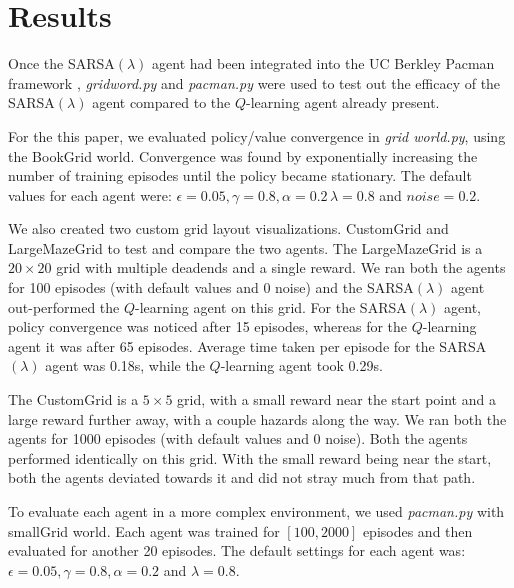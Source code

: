 \documentclass[10pt,conference]{IEEEtran}
\begin{document}
\section{Results}
\label{sec:results}
	
	Once the SARSA\((\lambda)\) agent had been integrated into
	the UC Berkley Pacman framework \cite{ucbai}, \textit{gridword.py} and 
	\textit{pacman.py} were used to test out the efficacy of the SARSA\((\lambda)\)
	agent compared to the \(Q\)-learning agent already present.  
	
	For the this paper, we evaluated policy/value convergence in \textit{grid world.py}, using
	the BookGrid world.  Convergence was found by exponentially increasing the
	number of training episodes until the policy became stationary.  The default
	values for each agent were: \(\epsilon = 0.05, \gamma = 0.8, \alpha = 0.2\,
	\lambda = 0.8\) and \(noise = 0.2\).

	We also created two custom grid layout visualizations. CustomGrid and LargeMazeGrid to test 
	and compare the two agents. The LargeMazeGrid is a \(20 \times 20\) grid with multiple deadends 
	and a single reward. We ran both the agents for 100 episodes (with default 
	values and 0 noise) and the SARSA\((\lambda)\) agent out-performed the 
	\(Q\)-learning agent on this grid. For the SARSA\((\lambda)\) agent, policy 
	convergence was noticed after 15 episodes, whereas for the \(Q\)-learning agent 
	it was after 65 episodes. Average time taken per episode for the 
	SARSA\((\lambda)\) agent was 0.18s, while the \(Q\)-learning agent took 0.29s.

	The CustomGrid is a \(5 \times 5\) grid, with a small reward near the start point and a 
	large reward further away, with a couple hazards along the way. We ran both the 
	agents for 1000 episodes (with default values and 0 noise). Both the agents 
	performed identically on this grid. With the small reward being near the 
	start, both the agents deviated towards it and did not stray much from that path. 
	
	To evaluate each agent in a more complex environment, we used 
	\textit{pacman.py} with smallGrid world. Each agent was trained for 
	\([100,2000]\) episodes and then evaluated for another 20 episodes.  The 
	default settings for each agent was: \(\epsilon = 0.05, \gamma = 0.8, 
	\alpha = 0.2\) and \(\lambda = 0.8\).
	
\end{document}

